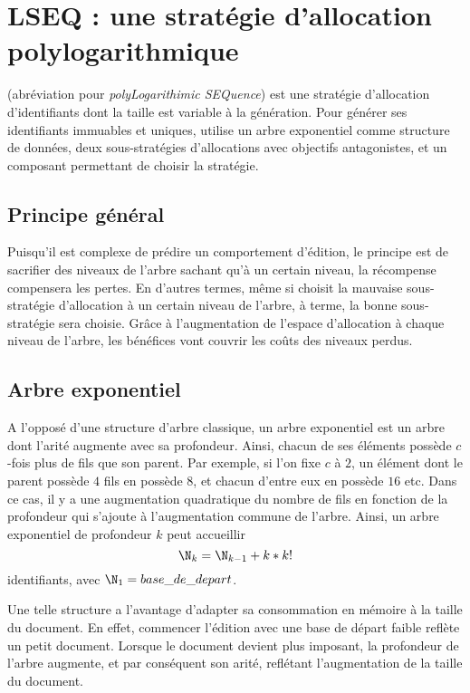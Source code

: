 
\section{LSEQ : une stratégie d'allocation polylogarithmique}

\LSEQ (abréviation pour \emph{polyLogarithimic SEQuence}) est une stratégie
d'allocation d'identifiants dont la taille est variable à la génération. Pour
générer ses identifiants immuables et uniques, \LSEQ utilise un arbre
exponentiel comme structure de données, deux sous-stratégies d'allocations avec
objectifs antagonistes, et un composant permettant de choisir la stratégie.

\subsection{Principe général}

Puisqu'il est complexe de prédire un comportement d'édition, le principe est de
sacrifier des niveaux de l'arbre sachant qu'à un certain niveau, la récompense
compensera les pertes. En d'autres termes, même si \LSEQ choisit la mauvaise
sous-stratégie d'allocation à un certain niveau de l'arbre, à terme, la bonne
sous-stratégie sera choisie. Grâce à l'augmentation de l'espace d'allocation à
chaque niveau de l'arbre, les bénéfices vont couvrir les coûts des niveaux
perdus.


\subsection{Arbre exponentiel}

A l'opposé d'une structure d'arbre classique, un arbre exponentiel est un arbre
dont l'arité augmente avec sa profondeur. Ainsi, chacun de ses éléments possède
$c$-fois plus de fils que son parent. Par exemple, si l'on fixe $c$ à $2$, un
élément dont le parent possède $4$ fils en possède $8$, et chacun d'entre eux en
possède $16$ etc. Dans ce cas, il y a une augmentation quadratique du nombre de
fils en fonction de la profondeur qui s'ajoute à l'augmentation commune de
l'arbre. Ainsi, un arbre exponentiel de profondeur $k$ peut accueillir 
\begin{equation}
  \N_k = \N_{k-1} + k * k!
\end{equation}
identifiants, avec $\N_1 = base\_de\_depart$.



Une telle structure a l'avantage d'adapter sa consommation en mémoire à la
taille du document. En effet, commencer l'édition avec une base de départ faible
reflète un petit document. Lorsque le document devient plus imposant, la
profondeur de l'arbre augmente, et par conséquent son arité, reflétant
l'augmentation de la taille du document.

